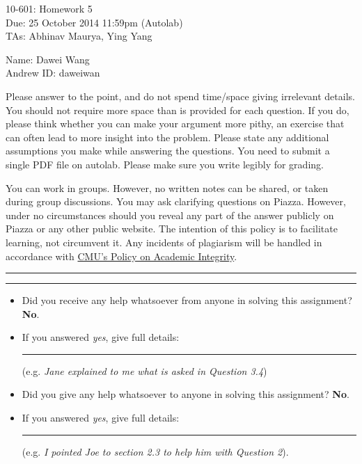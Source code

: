 \documentclass[11pt]{article}
\newif\ifprint
\newcommand{\mycoursenum}{10-601}
\newcommand{\myhwnum}{5}
\newcommand{\myname}{Dawei Wang}
\newcommand{\myandrew}{daweiwan}
\newcommand{\myfirstta}{Abhinav Maurya}
\newcommand{\mysecondta}{Ying Yang}
\newcommand{\question}[2] {\vspace{.25in} \hrule\vspace{0.5em} \noindent{\bf #1: #2} \vspace{0.5em} \hrule \vspace{.10in}}
\begin{document}
\medskip

\thispagestyle{plain}
\begin{center}
{\Large \mycoursenum: Homework \myhwnum} \\
Due: 25 October 2014 11:59pm (Autolab) \\
TAs: \myfirstta, \mysecondta \\
\medskip
\ifprint
Name: \rule{0.5\textwidth}{.4pt} \\
Andrew ID: \rule{0.45\textwidth}{.4pt} \\
\else
Name: \myname \\
Andrew ID: \myandrew \\
\fi
\end{center}

Please answer to the point, and do not spend time/space giving irrelevant details. You should not require more space than is provided for each question. If you do, please think whether you can make your argument more pithy, an exercise that can often lead to more insight into the problem. Please state any additional assumptions you make while answering the questions. You need to submit a single PDF file on autolab. Please make sure you write legibly for grading.

You can work in groups. However, no written notes can be shared, or taken during group discussions. You may ask clarifying questions on Piazza. However, under no circumstances should you reveal any part of the answer publicly on Piazza or any other public website. The intention of this policy is to facilitate learning, not circumvent it. Any incidents of plagiarism will be handled in accordance with \href{http://www.cmu.edu/policies/documents/Academic%20Integrity.htm}{CMU's Policy on Academic Integrity}.


\question{$\star$}{Code of Conduct Declaration}

\begin{itemize}
	\item Did you receive any help whatsoever from anyone in solving this assignment? {\bf No}.
	\item If you answered \emph{yes}, give full details: \rule{0.4\textwidth}{.4pt} (e.g. \emph{Jane explained to me what is asked in Question 3.4})
	\item Did you give any help whatsoever to anyone in solving this assignment? {\bf No}.
	\item If you answered \emph{yes}, give full details: \rule{0.4\textwidth}{.4pt} (e.g. \emph{I pointed Joe to section 2.3 to help him with Question 2}).
\end{itemize}
\end{document}
